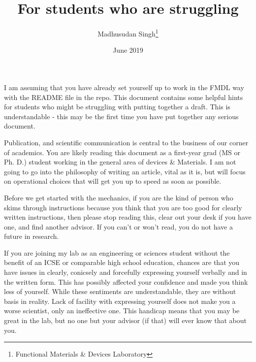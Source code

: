 \documentclass{article}
\title{For students who are struggling}
\author{Madhusudan Singh\thanks{Functional Materials \& Devices Laboratory}}
\date{June 2019}
\begin{document}
\maketitle

I am assuming that you have already set yourself up to work in the FMDL way with the README file in the repo. This document contains some helpful hints for students who might be struggling with putting together a draft. This is understandable - this may be the first time you have put together any serious document.

Publication, and scientific communication is central to the business of our corner of academics. You are likely reading this document as a first-year grad (MS or Ph. D.) student working in the general area of devices \& Materials. I am not going to go into the philosophy of writing an article, vital as it is, but will focus on operational choices that will get you up to speed as soon as possible.

Before we get started with the mechanics, if you are the kind of person who skims through instructions because you think that you are too good for clearly written instructions, then please stop reading this, clear out your desk if you have one, and find another advisor. If you can't or won't read, you do not have a future in research.


If you are joining my lab as an engineering or sciences student without the benefit of an ICSE or comparable high school education, chances are that you have issues in clearly, conicsely and forcefully expressing yourself verbally and in the written form. This has possibly affected your confidence and made you think less of yourself. While these sentiments are understandable, they are without basis in reality. Lack of facility with expressing yourself does not make you a worse scientist, only an ineffective one. This handicap means that you may be great in the lab, but no one but your advisor (if that) will ever know that about you.
\end{document}
